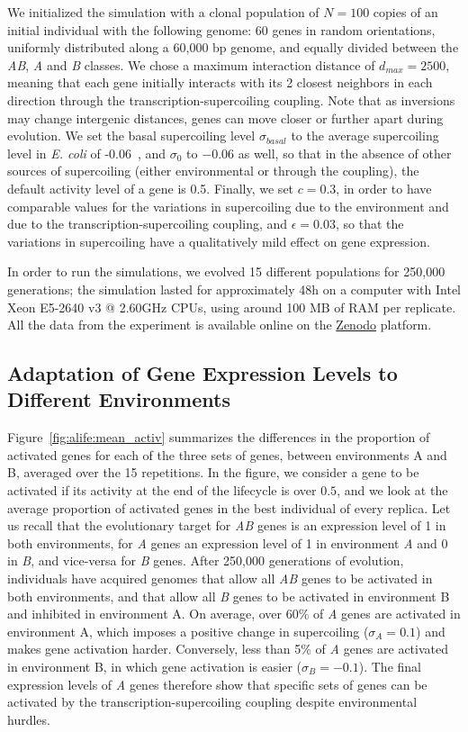 We initialized the simulation with a clonal population of $N=100$ copies of an initial individual with the following genome: 60 genes in random orientations, uniformly distributed along a 60,000 bp genome, and equally divided between the \emph{AB}, \emph{A} and \emph{B} classes.
We chose a maximum interaction distance of $d_{max} = 2500$, meaning that each gene initially interacts with its 2 closest neighbors in each direction through the transcription-supercoiling coupling.
Note that as inversions may change intergenic distances, genes can move closer or further apart during evolution.
We set the basal supercoiling level $\sigma_{basal}$ to the average supercoiling level in \emph{E. coli} of -0.06~\citep{crozat2005}, and $\sigma_0$ to $-0.06$ as well, so that in the absence of other sources of supercoiling (either environmental or through the coupling), the default activity level of a gene is 0.5.
Finally, we set $c = 0.3$, in order to have comparable values for the variations in supercoiling due to the environment and due to the transcription-supercoiling coupling, and $\epsilon=0.03$, so that the variations in supercoiling have a qualitatively mild effect on gene expression.

In order to run the simulations, we evolved 15 different populations for 250,000 generations; the simulation lasted for approximately 48h on a computer with Intel Xeon E5-2640 v3 @ 2.60GHz CPUs, using around 100 MB of RAM per replicate.
All the data from the experiment is available online on the \href{https://doi.org/10.5281/zenodo.6556310}{Zenodo} platform.

\subsection{Adaptation of Gene Expression Levels to Different Environments}

Figure~\ref{fig:alife:mean_activ} summarizes the differences in the proportion of activated genes for each of the three sets of genes, between environments A and B, averaged over the 15 repetitions.
In the figure, we consider a gene to be activated if its activity at the end of the lifecycle is over $0.5$, and we look at the average proportion of activated genes in the best individual of every replica.
Let us recall that the evolutionary target for \emph{AB} genes is an expression level of 1 in both environments, for \emph{A} genes an expression level of 1 in environment \emph{A} and 0 in \emph{B}, and vice-versa for \emph{B} genes.
After 250,000 generations of evolution, individuals have acquired genomes that allow all \emph{AB} genes to be activated in both environments, and that allow all \emph{B} genes to be activated in environment B and inhibited in environment A.
On average, over 60\% of \emph{A} genes are activated in environment A, which imposes a positive change in supercoiling ($\sigma_A = 0.1$) and makes gene activation harder.
Conversely, less than 5\% of \emph{A} genes are activated in environment B, in which gene activation is easier ($\sigma_B = -0.1$).
The final expression levels of \emph{A} genes therefore show that specific sets of genes can be activated by the transcription-supercoiling coupling despite environmental hurdles.

